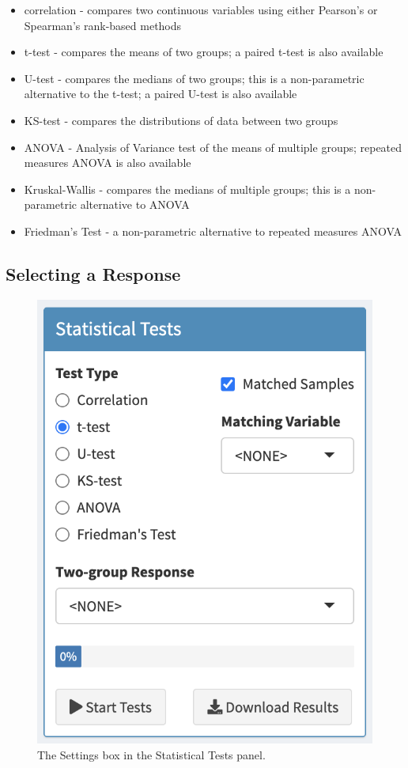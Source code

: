 \documentclass[
]{book}
\begin{document}
\begin{itemize}
\item
  correlation - compares two continuous variables using either Pearson's or Spearman's rank-based methods
\item
  t-test - compares the means of two groups; a paired t-test is also available
\item
  U-test - compares the medians of two groups; this is a non-parametric alternative to the t-test; a paired U-test is also available
\item
  KS-test - compares the distributions of data between two groups
\item
  ANOVA - Analysis of Variance test of the means of multiple groups; repeated measures ANOVA is also available
\item
  Kruskal-Wallis - compares the medians of multiple groups; this is a non-parametric alternative to ANOVA
\item
  Friedman's Test - a non-parametric alternative to repeated measures ANOVA
\end{itemize}

\hypertarget{selecting-a-response}{%
\subsection{Selecting a Response}\label{selecting-a-response}}

\begin{figure}
\centering
\includegraphics{images/StatTest_Settings.png}
\caption{The Settings box in the Statistical Tests panel.}
\end{figure}
\end{document}

